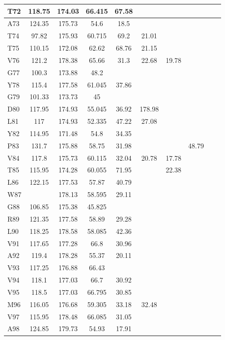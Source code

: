 \documentclass[%
 aip,
 amsmath,amssymb,
 preprint,%
]{revtex4-1}
\begin{document}
\begin{center}
\begin{longtable}{l|c|c|c|c|c|c|c|c|c}
T72 & 118.75 & 174.03 & 66.415 & 67.58 & & & & & \\\hline
A73 & 124.35 & 175.73 & 54.6 & 18.5 & & & & & \\\hline
T74 & 97.82 & 175.93 & 60.715 & 69.2 & 21.01 & & & & \\\hline
T75 & 110.15 & 172.08 & 62.62 & 68.76 & 21.15 & & & & \\\hline
V76 & 121.2 & 178.38 & 65.66 & 31.3 & 22.68 & 19.78 & & & \\\hline
G77 & 100.3 & 173.88 & 48.2 & & & & & & \\\hline
Y78 & 115.4 & 177.58 & 61.045 & 37.86 & & & & & \\\hline
G79 & 101.33 & 173.73 & 45 & & & & & & \\\hline
D80 & 117.95 & 174.93 & 55.045 & 36.92 & 178.98 & & & & \\\hline
L81 & 117 & 174.93 & 52.335 & 47.22 & 27.08 & & & & \\\hline
Y82 & 114.95 & 171.48 & 54.8 & 34.35 & & & & & \\\hline
P83 & 131.7 & 175.88 & 58.75 & 31.98 & & & 48.79 & & \\\hline
V84 & 117.8 & 175.73 & 60.115 & 32.04 & 20.78 & 17.78 & & & \\\hline
T85 & 115.95 & 174.28 & 60.055 & 71.95 & & 22.38 & & & \\\hline
L86 & 122.15 & 177.53 & 57.87 & 40.79 & & & & & \\\hline
W87 & & 178.13 & 58.595 & 29.11 & & & & & \\\hline
G88 & 106.85 & 175.38 & 45.825 & & & & & & \\\hline
R89 & 121.35 & 177.58 & 58.89 & 29.28 & & & & & \\\hline
L90 & 118.25 & 178.58 & 58.085 & 42.36 & & & & & \\\hline
V91 & 117.65 & 177.28 & 66.8 & 30.96 & & & & & \\\hline
A92 & 119.4 & 178.28 & 55.37 & 20.11 & & & & & \\\hline
V93 & 117.25 & 176.88 & 66.43 & & & & & & \\\hline
V94 & 118.1 & 177.03 & 66.7 & 30.92 & & & & & \\\hline
V95 & 118.5 & 177.03 & 66.795 & 30.85 & & & & & \\\hline
M96 & 116.05 & 176.68 & 59.305 & 33.18 & 32.48 & & & & \\\hline
V97 & 115.95 & 178.48 & 66.085 & 31.05 & & & & & \\\hline
A98 & 124.85 & 179.73 & 54.93 & 17.91 & & & & & \\\hline

\end{longtable}
\end{center}
\end{document}
